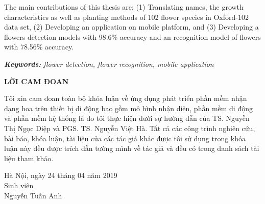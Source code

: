 \documentclass[12pt]{report}
\begin{document}
		The main contributions of this thesis are: (1) Translating names, the growth characteristics as well as planting methods of 102 flower species in Oxford-102 data set, (2) Developing an application on mobile platform, and (3) Developing a flowers detection models with 98.6\% accuracy and an recognition model of flowers with 78.56\% accuracy.
																																																																										
																																																																										
		\noindent \textit{\textbf{Keywords:} flower detection, flower recognition, mobile application}
																																																																										
		\newpage
		\begin{center}
			\textbf{\large LỜI CAM ĐOAN}
		\end{center}
		Tôi xin cam đoan toàn bộ khóa luận về ứng dụng phát triển phần mềm nhận dạng hoa trên thiết bị di động bao gồm mô hình nhận diện, phần mềm di động và phần mềm hệ thống là do tôi thực hiện dưới sự hướng dẫn của TS. Nguyễn Thị Ngọc Diệp và PGS. TS. Nguyễn Việt Hà. Tất cả các công trình nghiên cứu, bài báo, khóa luận, tài liệu của các tác giả khác được tôi sử dụng trong khóa luận này đều được trích dẫn tường mình về tác giả và đều có trong danh sách tài liệu tham khảo.
																																																																										
		\begin{flushright}
			\begin{varwidth}{\linewidth}\centering
				Hà Nội, ngày 24 tháng 04 năm 2019\\
				Sinh viên\\[2cm]
				Nguyễn Tuấn Anh
			\end{varwidth}
		\end{flushright}
																																																																										
		\newpage
		\tableofcontents
																																																																										
		\newpage
		\listoftables
																																																																										
\end{document}
